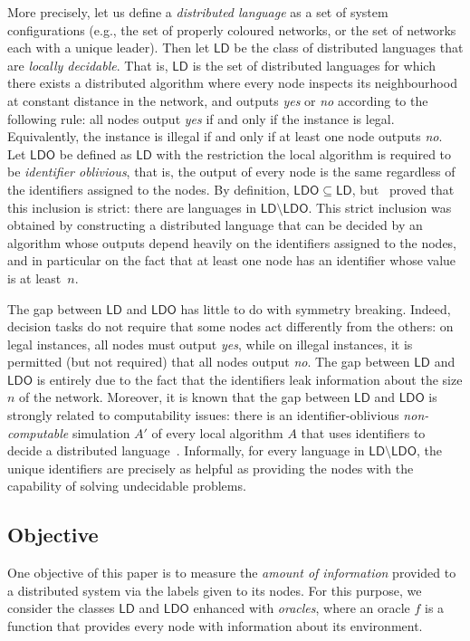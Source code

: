 \documentclass[11pt,a4paper]{article}
\theoremstyle{definition}
\theoremstyle{remark}
\newcommand{\ldo}{\mathsf{LDO}}
\newcommand{\ld}{\mathsf{LD}}
\begin{document}
More precisely, let us define a \emph{distributed language} as a set of system configurations (e.g., the set of properly coloured networks, or the set of networks each with a unique leader). Then let $\ld$ be the class of distributed languages that are \emph{locally decidable}. That is, $\ld$ is the set of distributed languages for which there exists a distributed algorithm where every node inspects its neighbourhood at constant distance in the network, and outputs \emph{yes} or \emph{no} according to the following rule:  all nodes output \emph{yes} if and only if the instance is legal. Equivalently, the instance is illegal if and only if at least one node outputs \emph{no}. Let $\ldo$ be defined as $\ld$ with the restriction the local algorithm is required to be \emph{identifier oblivious}, that is, the output of every node is the same regardless of the identifiers assigned to the nodes. By definition, $\ldo\subseteq \ld$, but~\cite{fraigniaud13ld-id} proved that this inclusion is strict: there are languages in $\ld\setminus\ldo$. This strict inclusion was obtained by constructing a distributed language that can be decided by an algorithm whose outputs depend heavily on the identifiers assigned to the nodes, and in particular on the fact that at least one node has an identifier whose value is at least~$n$.

The gap between $\ld$ and $\ldo$ has little to do with symmetry breaking. Indeed, decision tasks do not require that some nodes act differently from the others: on legal instances, all nodes must output \emph{yes}, while on illegal instances, it is permitted (but not required) that all nodes output \emph{no}. The gap between $\ld$ and $\ldo$ is entirely due to the fact that the identifiers leak information about the size $n$ of the network. Moreover, it is known that the gap between $\ld$ and $\ldo$ is strongly related to computability issues: there is an identifier-oblivious \emph{non-computable} simulation $A'$ of every local algorithm $A$ that uses identifiers to decide a distributed language~\cite{fraigniaud13ld-id}. Informally, for every language in $\ld\setminus\ldo$, the unique identifiers are precisely as helpful as providing the nodes with the capability of solving undecidable problems.

\subsection{Objective}

One objective of this paper is to measure the \emph{amount of information} provided to a distributed system via the labels given to its nodes. For this purpose, we consider  the classes $\ld$ and  $\ldo$ enhanced with \emph{oracles}, where an oracle $f$ is a function that provides every node with information about its environment.
\end{document}
